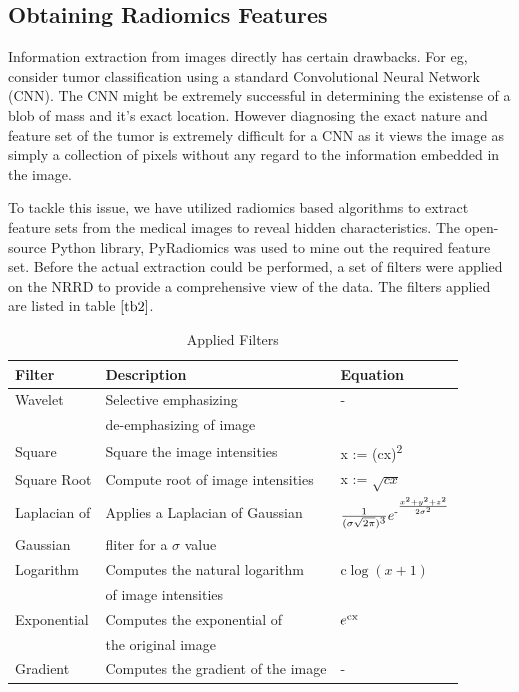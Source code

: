 \documentclass[final,1p,times,twocolumn]{elsarticle}
\newcommand\sufr[3][0pt]{$\rule{0pt}{\dimexpr#1+1.4ex\relax}^\frac{#2}{#3}$}
\begin{document}
\subsection{Obtaining Radiomics Features}

Information extraction from images directly has certain drawbacks. For eg, consider tumor classification using a standard Convolutional Neural Network (CNN). The CNN might be extremely successful in determining the existense of a blob of mass and it's exact location. However diagnosing the exact nature and feature set of the tumor is extremely difficult for a CNN as it views the image as simply a collection of pixels without any regard to the information embedded in the image.

To tackle this issue, we have utilized radiomics based algorithms to extract feature sets from the medical images to reveal hidden characteristics. The open-source Python library, PyRadiomics was used to mine out the required feature set. Before the actual extraction could be performed, a set of filters were applied on the NRRD to provide a comprehensive view of the data. The filters applied are listed in table $\ref{tb2}$. 

\begin{table}[!b]
\scriptsize
\centering
\caption{Applied Filters}
\label{tb2}
\begin{tabular}{| l | l | l |}
\hline
\textbf{Filter} & \textbf{Description} & \textbf{Equation}\\
\hline
Wavelet & Selective emphasizing  & -\\
&de-emphasizing of image&\\
\hline
Square & Square the image intensities & x := (cx)\textsuperscript{2}\\
\hline
Square Root & Compute root of image intensities & x := $\sqrt{cx}$\\
\hline
Laplacian of & Applies a Laplacian of Gaussian & $\frac{1}{(\sigma\sqrt{2\pi})\textsuperscript{3}}e\textsuperscript{-\sufr{x\textsuperscript{2}+y\textsuperscript{2}+z\textsuperscript{2}}{2\sigma\textsuperscript{2}}}$\\
Gaussian &fliter for a $\sigma$ value&\\
\hline
Logarithm & Computes the natural logarithm& c$\log(x+1)$\\
& of image intensities &\\
\hline
Exponential & Computes the exponential of & $e\textsuperscript{cx}$\\
&the original image &\\
\hline
Gradient & Computes the gradient of the image & -\\
\hline
\end{tabular}
\end{table}
\end{document}
